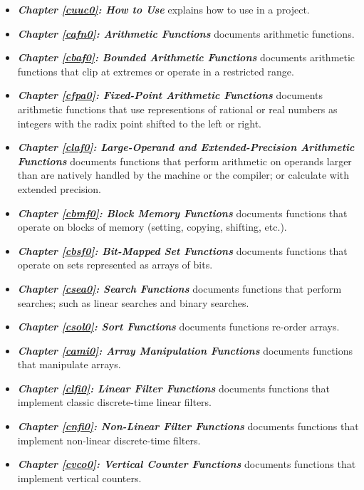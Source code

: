\begin{itemize}
\item \emph{\textbf{Chapter \ref{cuuc0}: How to Use \productbasenameshort{}}}
      explains how to use \productbasenameshort{} in a project.
\item \emph{\textbf{Chapter \ref{cafn0}: Arithmetic Functions}}
      documents arithmetic functions.
\item \emph{\textbf{Chapter \ref{cbaf0}: Bounded Arithmetic Functions}}
      documents arithmetic functions that clip at extremes or operate in
      a restricted range.
\item \emph{\textbf{Chapter \ref{cfpa0}: Fixed-Point Arithmetic Functions}}
      documents arithmetic functions that use representions of rational or real
      numbers as integers with the radix point shifted to the left or right.
\item \emph{\textbf{Chapter \ref{claf0}: Large-Operand and Extended-Precision Arithmetic Functions}}
      documents functions that perform arithmetic on operands
      larger than are natively handled by the machine or the compiler; or
      calculate with extended precision.
\item \emph{\textbf{Chapter \ref{cbmf0}: Block Memory Functions}}
      documents functions that operate on blocks of memory
      (setting, copying, shifting, etc.).
\item \emph{\textbf{Chapter \ref{cbsf0}: Bit-Mapped Set Functions}}
      documents functions that operate on sets represented
      as arrays of bits.
\item \emph{\textbf{Chapter \ref{csea0}: Search Functions}}
      documents functions that perform searches; such as linear searches
      and binary searches.
\item \emph{\textbf{Chapter \ref{csol0}: Sort Functions}}
      documents functions re-order arrays.
\item \emph{\textbf{Chapter \ref{cami0}: Array Manipulation Functions}}
      documents functions that manipulate arrays.
\item \emph{\textbf{Chapter \ref{clfi0}: Linear Filter Functions}}
      documents functions that implement classic discrete-time linear filters.
\item \emph{\textbf{Chapter \ref{cnfi0}: Non-Linear Filter Functions}}
      documents functions that implement non-linear discrete-time filters.
\item \emph{\textbf{Chapter \ref{cvco0}: Vertical Counter Functions}}
      documents functions that implement vertical counters.

\end{itemize}
